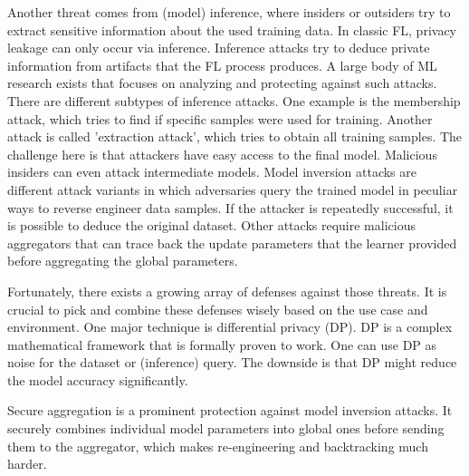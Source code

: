 Another threat comes from (model) inference, where 
insiders or outsiders try to extract sensitive information
about the used training data.
In classic FL, privacy leakage can only occur via inference.
Inference attacks try to deduce private information from
artifacts that the FL process produces.
A large body of ML research exists that focuses on
analyzing and protecting against such attacks.
There are different subtypes of inference attacks.
One example is the membership attack, which tries to find if
specific samples were used for training.
Another attack is called 'extraction attack', which tries to
obtain all training samples.
The challenge here is that attackers have easy access to the final model.
Malicious insiders can even attack intermediate models.
Model inversion attacks are different attack variants in which adversaries
query the trained model in peculiar ways to reverse engineer data samples. 
If the attacker is repeatedly successful, it is possible to
deduce the original dataset.
Other attacks require malicious aggregators that can trace back
the update parameters that the learner provided before aggregating
the global parameters.

Fortunately, there exists a growing array of defenses against those threats.
It is crucial to pick and combine these defenses wisely based on the use case and environment.
One major technique is differential privacy (DP).
DP is a complex mathematical framework that is formally proven to work.
One can use DP as noise for the dataset or (inference) query.
The downside is that DP might reduce the model accuracy significantly.

Secure aggregation is a prominent protection against model inversion attacks.
It securely combines individual model parameters into global ones before
sending them to the aggregator, which makes re-engineering and backtracking much harder. \cite{paper:cluster-based-secure-aggregation-FL}